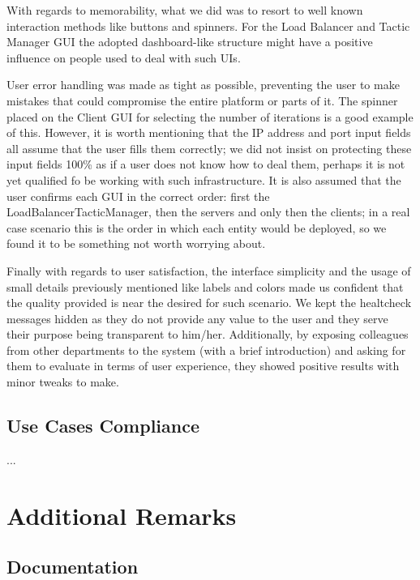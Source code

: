 \documentclass[12pt]{article}
\begin{document}
With regards to memorability, what we did was to resort to well known interaction methods like buttons and spinners.
For the Load Balancer and Tactic Manager GUI the adopted dashboard-like structure might have a positive influence on people used to deal with such UIs.

User error handling was made as tight as possible, preventing the user to make mistakes that could compromise the entire platform or parts of it.
The spinner placed on the Client GUI for selecting the number of iterations is a good example of this.
However, it is worth mentioning that the IP address and port input fields all assume that the user fills them correctly; we did not insist on protecting these 
input fields 100\% as if a user does not know how to deal them, perhaps it is not yet qualified fo be working with such infrastructure.
It is also assumed that the user confirms each GUI in the correct order: first the LoadBalancerTacticManager, then the servers and only then the clients; in 
a real case scenario this is the order in which each entity would be deployed, so we found it to be something not worth worrying about.

Finally with regards to user satisfaction, the interface simplicity and the usage of small details previously mentioned like labels and colors made us confident
that the quality provided is near the desired for such scenario.
We kept the healtcheck messages hidden as they do not provide any value to the user and they serve their purpose being transparent to him/her.
Additionally, by exposing colleagues from other departments to the system (with a brief introduction) and asking for them to evaluate in terms of user experience,
they showed positive results with minor tweaks to make.

\subsection{Use Cases Compliance} \label{compliance} %

...

\newpage
\section{Additional Remarks} \label{remarks} %

\subsection{Documentation} \label{documentation} %
\end{document}
